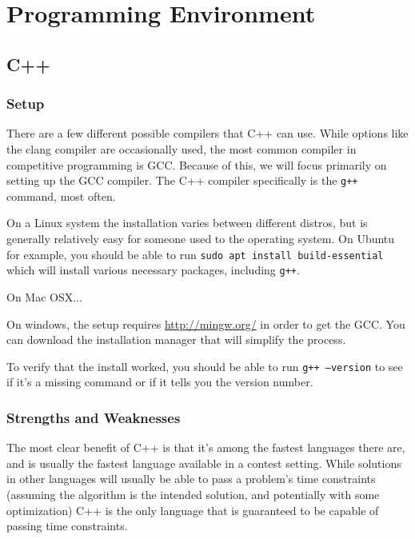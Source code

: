 \section{Programming Environment}

\subsection{C++}

\subsubsection{Setup}

There are a few different possible compilers that C++ can use. While options like the clang compiler are occasionally used, the most common compiler in competitive programming is GCC. Because of this, we will focus primarily on setting up the GCC compiler. The C++ compiler specifically is the \texttt{g++} command, most often.

On a Linux system the installation varies between different distros, but is generally relatively easy for someone used to the operating system. On Ubuntu for example, you should be able to run \texttt{sudo apt install build-essential} which will install various necessary packages, including \texttt{g++}.

On Mac OSX...

On windows, the setup requires \url{http://mingw.org/} in order to get the GCC. You can download the installation manager that will simplify the process.

To verify that the install worked, you should be able to run \texttt{g++ --version} to see if it's a missing command or if it tells you the version number.

\subsubsection{Strengths and Weaknesses}

The most clear benefit of C++ is that it's among the fastest languages there are, and is usually the fastest language available in a contest setting. While solutions in other languages will usually be able to pass a problem's time constraints (assuming the algorithm is the intended solution, and potentially with some optimization) C++ is the only language that is guaranteed to be capable of passing time constraints.

